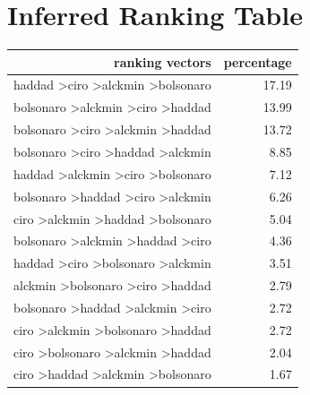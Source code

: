 \documentclass[hidelinks,11pt]{article}
\begin{document}
\section{Inferred Ranking Table} \label{appendix:inferred1}


\begin{table}[H]
  \centering
\begin{tabular}{|r|r|}
\hline
\textbf{ranking vectors}                           & \textbf{percentage} \\ \hline
haddad \textgreater ciro \textgreater alckmin \textgreater bolsonaro & 17.19                                \\ \hline
bolsonaro \textgreater alckmin \textgreater ciro \textgreater haddad & 13.99                                \\ \hline
bolsonaro \textgreater ciro \textgreater alckmin \textgreater haddad & 13.72                                \\ \hline
bolsonaro \textgreater ciro \textgreater haddad \textgreater alckmin & 8.85                                 \\ \hline
haddad \textgreater alckmin \textgreater ciro \textgreater bolsonaro & 7.12                                 \\ \hline
bolsonaro \textgreater haddad \textgreater ciro \textgreater alckmin & 6.26                                 \\ \hline
ciro \textgreater alckmin \textgreater haddad \textgreater bolsonaro & 5.04                                 \\ \hline
bolsonaro \textgreater alckmin \textgreater haddad \textgreater ciro & 4.36                                 \\ \hline
haddad \textgreater ciro \textgreater bolsonaro \textgreater alckmin & 3.51                                 \\ \hline
alckmin \textgreater bolsonaro \textgreater ciro \textgreater haddad & 2.79                                 \\ \hline
bolsonaro \textgreater haddad \textgreater alckmin \textgreater ciro & 2.72                                 \\ \hline
ciro \textgreater alckmin \textgreater bolsonaro \textgreater haddad & 2.72                                 \\ \hline
ciro \textgreater bolsonaro \textgreater alckmin \textgreater haddad & 2.04                                 \\ \hline
ciro \textgreater haddad \textgreater alckmin \textgreater bolsonaro & 1.67                                 \\ \hline

\end{tabular}
\end{table}
\end{document}
